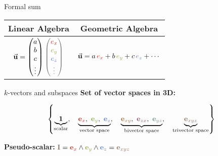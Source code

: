 \begin{frame}{Formal sum}
    \large
    \begin{center}
        \renewcommand{\arraystretch}{2.0} %
        \begin{tabular}{|c|c|}
            \hline
            \textbf{Linear Algebra} & \textbf{Geometric Algebra} \\ \hline
            $\vec{\mathbf{u}} =
                \begin{pmatrix}
                    a \\
                    b \\
                    c \\
                    \vdots
                \end{pmatrix}
                \textcolor{gray}{
                    \begin{pmatrix}
                        \textcolor{red}{e_x}   \\
                        \textcolor{green}{e_y} \\
                        \textcolor{blue}{e_z}  \\
                        \vdots
                    \end{pmatrix}
                }$
                                    &
            $\vec{\mathbf{u}} = a\, \textcolor{red}{e_x} + b\, \textcolor{green}{e_y} + c\, \textcolor{blue}{e_z} + \cdots$
            \\ \hline
        \end{tabular}
    \end{center}
\end{frame}









\begin{frame}{$k$-vectors and subspaces}
    \textbf{Set of vector spaces in 3D:}

    \vspace{1em}

    \[
        \left\{
        \underbrace{\mathbf{1}}_{\text{scalar}},\quad
        \underbrace{
            \textcolor{red}{\mathbf{e}_x},\
            \textcolor{green}{\mathbf{e}_y},\
            \textcolor{blue}{\mathbf{e}_z}
        }_{\text{vector space}},\quad
        \underbrace{
            \textcolor{midredgreen}{\mathbf{e}_{xy}},\
            \textcolor{midredblue}{\mathbf{e}_{zx}},\
            \textcolor{midgreenblue}{\mathbf{e}_{yz}}
        }_{\text{bivector space}},\quad
        \underbrace{
            \textcolor{mixAll}{\mathbf{e}_{xyz}}
        }_{\text{trivector space}}
        \right\}
    \]

    \vspace{1em}

    \textbf{Pseudo-scalar: }
    \(
    \textcolor{mixAll}{\mathbf{I}} =
    \textcolor{red}{\mathbf{e}_x} \wedge
    \textcolor{green}{\mathbf{e}_y} \wedge
    \textcolor{blue}{\mathbf{e}_z} =
    \textcolor{mixAll}{\mathbf{e}_{xyz}}
    \)
\end{frame}